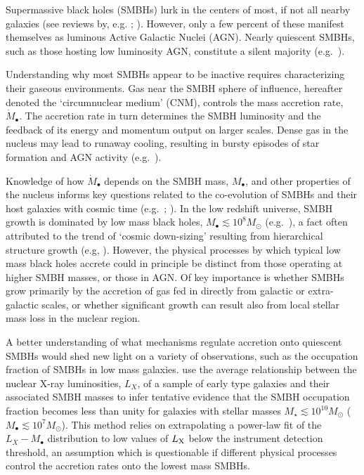 \documentclass[usenatbib,fleqn]{mn2e}
\newcommand{\Mbh}[1][]{M_{\bullet#1}}
\begin{document}
Supermassive black holes (SMBHs) lurk in the centers of most, if not
all nearby galaxies (see reviews by,
e.g. \citealt{KormendyRichstone:1995a};
\citealt{FerrareseFord:2005a}). However, only a few percent of these
manifest themselves as luminous Active Galactic Nuclei (AGN).  Nearly
quiescent SMBHs, such as those hosting low luminosity AGN, constitute
a silent majority (e.g.~\citealt{Ho:2009a}).

Understanding why most SMBHs appear to be inactive requires
characterizing their gaseous environments.  Gas near the SMBH sphere
of influence, hereafter denoted the `circumnuclear medium' (CNM),
controls the mass accretion rate, $\dot{M}_{\bullet}$.  The accretion
rate in turn determines the SMBH luminosity and the feedback of its
energy and momentum output on larger scales.  Dense gas in the nucleus
may lead to runaway cooling, resulting in bursty episodes of star
formation and AGN activity (e.g.~\citealt{Ciotti&Ostriker07}).

Knowledge of how $\dot{M}_{\bullet}$ depends on the SMBH mass, $\Mbh$,
and other properties of the nucleus informs key questions related to
the co-evolution of SMBHs and their host galaxies with cosmic time
(e.g.~\citealt{Kormendy&Ho13}; \citealt{HeckmanBest:2014a}).  In the
low redshift universe, SMBH growth is dominated by low mass black
holes, $M_{\bullet} \lesssim 10^{8}M_{\odot}$
(e.g.~\citealt{Heckman+04}), a fact often attributed to the trend of
`cosmic down-sizing' resulting from hierarchical structure growth
(e.g, \citealt{Gallo+08}).  However, the physical processes by which
typical low mass black holes accrete could in principle be distinct
from those operating at higher SMBH masses, or those in AGN.  Of key
importance is whether SMBHs grow primarily by the accretion of gas fed
in directly from galactic or extra-galactic scales, or whether
significant growth can result also from local stellar mass loss in the
nuclear region.

A better understanding of what mechanisms regulate accretion onto
quiescent SMBHs would shed new light on a variety of observations,
such as the occupation fraction of SMBHs in low mass galaxies.
\citet{Miller+15} use the average relationship between the nuclear
X-ray luminosities, $L_{X}$, of a sample of early type galaxies and
their associated SMBH masses to infer tentative evidence that the SMBH
occupation fraction becomes less than unity for galaxies with stellar
masses $M_{\star} \lesssim 10^{10}M_{\odot}$ ($M_{\bullet} \lesssim
10^{7}M_{\odot}$).  This method relies on extrapolating a power-law
fit of the $L_X-\Mbh$ distribution to low values of $L_{\rm X}$ below
the instrument detection threshold, an assumption which is
questionable if different physical processes control the accretion
rates onto the lowest mass SMBHs.
\end{document}
